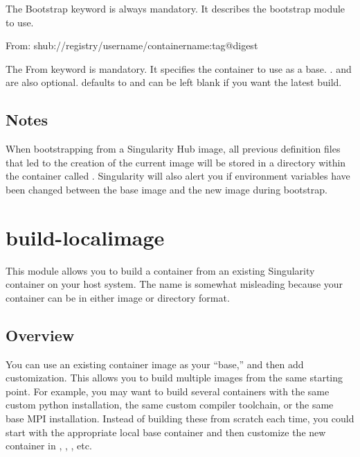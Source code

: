 \documentclass[letterpaper,10pt,english]{sphinxmanual}
\begin{document}
The Bootstrap keyword is always mandatory. It describes the bootstrap module to use.

%
\begin{sphinxVerbatim}[commandchars=\\\{\}]
From: shub://\PYGZlt{}registry\PYGZgt{}/\PYGZlt{}username\PYGZgt{}/\PYGZlt{}container\PYGZhy{}name\PYGZgt{}:\PYGZlt{}tag\PYGZgt{}@digest
\end{sphinxVerbatim}

The From keyword is mandatory. It specifies the container to use as a base. .
 and  are also optional.  defaults to  and  can be left blank if you want the latest build.


\subsection{Notes}
\label{\detokenize{appendix:id5}}
When bootstrapping from a Singularity Hub image, all previous definition files that led to the creation of the current image will be stored
in a directory within the container called . Singularity will also alert you if environment variables have
been changed between the base image and the new image during bootstrap.


\section{build-localimage}
\label{\detokenize{appendix:build-localimage}}\label{\detokenize{appendix:id6}}\label{\detokenize{appendix:sec-build-localimage}}
This module allows you to build a container from an existing Singularity container on your host system. The name is somewhat misleading
because your container can be in either image or directory format.


\subsection{Overview}
\label{\detokenize{appendix:id7}}
You can use an existing container image as your “base,” and then add customization. This allows you to build multiple images from the same
starting point. For example, you may want to build several containers with the same custom python installation, the same custom compiler
toolchain, or the same base MPI installation. Instead of building these from scratch each time, you could start with the appropriate local
base container and then customize the new container in , , , etc.
\end{document}
